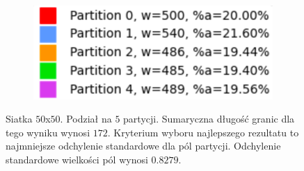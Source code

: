 \begin{figure}[h]
\centering
\begin{subfigure}{.33\textwidth}
    \centering
    \caption[short]{}
\end{subfigure}%
\begin{subfigure}{.33\textwidth}
    \centering
    \caption[short]{}
\end{subfigure}%
\begin{subfigure}{.33\textwidth}
    \centering
    \includegraphics[width=0.9\linewidth]{images/results/m_k/with/6/results}
    \caption[short]{}
\end{subfigure}
\caption{Siatka $50$x$50$. Podział na $5$ partycji. Sumaryczna długość granic dla tego wyniku wynosi $172$.
Kryterium wyboru najlepszego rezultatu to najmniejsze odchylenie standardowe dla pól partycji.
Odchylenie standardowe wielkości pól wynosi $0.8279$.}
\label{result:6}
\end{figure}
